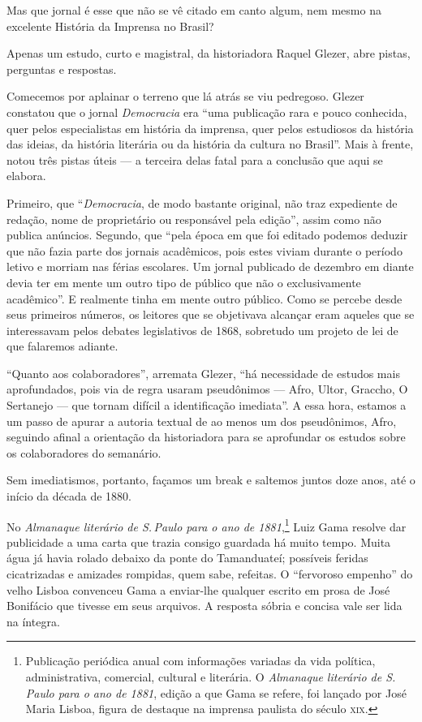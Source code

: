 Mas que jornal é esse que não se vê citado em canto algum, nem mesmo na
excelente História da Imprensa no Brasil?

Apenas um estudo, curto e magistral, da historiadora Raquel Glezer, abre
pistas, perguntas e respostas.

Comecemos por aplainar o terreno que lá atrás se viu pedregoso. Glezer
constatou que o jornal \emph{Democracia} era ``uma publicação rara e %
pouco conhecida, quer pelos especialistas em história da imprensa, quer
pelos estudiosos da história das ideias, da história literária ou da
história da cultura no Brasil''. Mais à frente, notou três pistas úteis
--- a terceira delas fatal para a conclusão que aqui se elabora.

Primeiro, que ``\emph{Democracia}, de modo bastante original, não traz
expediente de redação, nome de proprietário ou responsável pela edição'',
assim como não publica anúncios. Segundo, que ``pela época em que
foi editado podemos deduzir que não fazia parte dos jornais acadêmicos,
pois estes viviam durante o período letivo e morriam nas férias
escolares. Um jornal publicado de dezembro em diante devia ter em mente
um outro tipo de público que não o exclusivamente acadêmico''. E
realmente tinha em mente outro público. Como se percebe desde seus
primeiros números, os leitores que se objetivava alcançar eram aqueles
que se interessavam pelos debates legislativos de 1868, sobretudo um
projeto de lei de que falaremos adiante.

``Quanto aos colaboradores'', arremata Glezer, ``há necessidade de estudos
mais aprofundados, pois via de regra usaram pseudônimos --- Afro, Ultor,
Graccho, O Sertanejo --- que tornam difícil a identificação imediata''. A
essa hora, estamos a um passo de apurar a autoria textual de ao menos um
dos pseudônimos, Afro, seguindo afinal a orientação da historiadora para
se aprofundar os estudos sobre os colaboradores do semanário.

Sem imediatismos, portanto, façamos um break e saltemos juntos doze
anos, até o início da década de 1880.

No \emph{Almanaque literário de S.\,Paulo para o ano de 1881},\footnote{Publicação periódica anual com informações variadas da vida política,
  administrativa, comercial, cultural e literária. O \emph{Almanaque
  literário de S.\,Paulo para o ano de 1881}, edição a que Gama se
  refere, foi lançado por José Maria Lisboa, figura de destaque na
  imprensa paulista do século \textsc{xix}.} Luiz Gama resolve dar publicidade a
uma carta que trazia consigo guardada há muito tempo. Muita água já
havia rolado debaixo da ponte do Tamanduateí; possíveis feridas
cicatrizadas e amizades rompidas, quem sabe, refeitas. O ``fervoroso
empenho'' do velho Lisboa convenceu Gama a enviar-lhe qualquer escrito em
prosa de José Bonifácio que tivesse em seus arquivos. A resposta sóbria
e concisa vale ser lida na íntegra.


